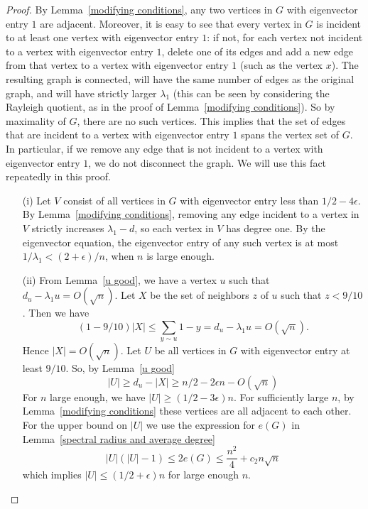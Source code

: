 \begin{proof}
  By Lemma~\ref{modifying conditions}, any two vertices in $G$ with eigenvector entry $1$ are adjacent.  Moreover, it is easy to see that
  every vertex in $G$ is incident to at least one vertex with eigenvector entry $1$:  if not, for each vertex not incident to a vertex
  with eigenvector entry $1$, delete one of its edges and add a new edge from that vertex to a vertex with eigenvector entry $1$ (such as
  the vertex $x$).  The resulting graph is connected, will have the same number of edges as the original graph, and will have strictly larger $\lambda_1$
  (this can be seen by considering the Rayleigh quotient, as in the proof of Lemma~\ref{modifying conditions}).
  So by maximality of $G$, there are no such vertices.  This implies that the set of edges that are incident
  to a vertex with eigenvector entry $1$ spans the vertex set of $G$. 
  In particular, if we remove any edge that is not incident to a vertex with eigenvector entry $1$, we do not disconnect the graph.  We will use this fact repeatedly in this proof.

 
  
\begin{itemize}
\item[(i)] Let $V$ consist of all vertices in $G$ with eigenvector entry 
less than $1/2 - 4 \epsilon$.  By Lemma~\ref{modifying conditions}, removing 
any edge incident to a vertex in $V$ strictly increases $\lambda_1 - d$, so each vertex in $V$ has degree one.  By the eigenvector equation,
the eigenvector entry of any such vertex is at most $1/\lambda_1 < (2+\epsilon) / n $, when $n$ is large enough.
\item[(ii)] From Lemma~\ref{u good}, we have a vertex $u$ such that $d_u - \lambda_1 u = O(\sqrt{n})$.  Let $X$ be the set of neighbors $z$ of $u$ such that $z < 9/10$.  Then we have
 \[ (1 - 9/10)|X| \leq \sum_{y \sim u} 1 - y = d_u - \lambda_1 u = O(\sqrt{n}). \]
Hence $|X| = O(\sqrt{n})$.  Let $U$ be all vertices in $G$ with eigenvector entry at least $9/10$.  So, by Lemma~\ref{u good}
 \[ |U| \geq d_u - |X| \geq n/2 - 2 \epsilon n - O(\sqrt{n})\]
For $n$ large enough, we have $|U| \geq (1/2 - 3\epsilon) n$. For sufficiently large $n$, by Lemma~\ref{modifying conditions} these vertices are all adjacent to each other.  For the upper bound on $|U|$ we use the expression for $e(G)$ in Lemma~\ref{spectral radius and average degree}
\[ |U| (|U| - 1) \leq 2e(G) \leq  \frac{n^2}{4} + c_2n\sqrt{n}\]
which implies $|U| \leq (1/2+\epsilon) n$ for large enough $n$.


\end{itemize}
\end{proof}
